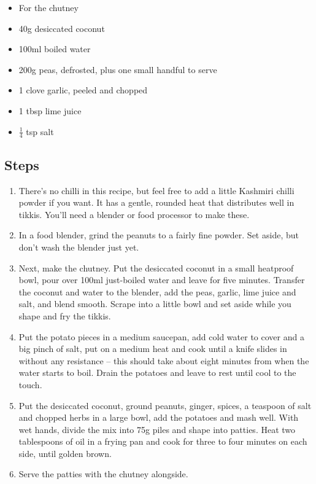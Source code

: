 \documentclass{book}
\begin{document}
\begin{itemize}
\item For the chutney
\item 40g desiccated coconut
\item 100ml boiled water
\item 200g peas, defrosted, plus one small handful to serve
\item 1 clove garlic, peeled and chopped
\item 1 tbsp lime juice 
\item $\frac{1}{4}$ tsp salt
\end{itemize}

\subsection*{Steps}
\begin{enumerate}
\item There’s no chilli in this recipe, but feel free to add a little Kashmiri chilli powder if you want. It has a gentle, rounded heat that distributes well in tikkis. You’ll need a blender or food processor to make these.
\item In a food blender, grind the peanuts to a fairly fine powder. Set aside, but don’t wash the blender just yet.
\item Next, make the chutney. Put the desiccated coconut in a small heatproof bowl, pour over 100ml just-boiled water and leave for five minutes. Transfer the coconut and water to the blender, add the peas, garlic, lime juice and salt, and blend smooth. Scrape into a little bowl and set aside while you shape and fry the tikkis.
\item Put the potato pieces in a medium saucepan, add cold water to cover and a big pinch of salt, put on a medium heat and cook until a knife slides in without any resistance – this should take about eight minutes from when the water starts to boil. Drain the potatoes and leave to rest until cool to the touch.
\item Put the desiccated coconut, ground peanuts, ginger, spices, a teaspoon of salt and chopped herbs in a large bowl, add the potatoes and mash well. With wet hands, divide the mix into 75g piles and shape into patties. Heat two tablespoons of oil in a frying pan and cook for three to four minutes on each side, until golden brown.
\item Serve the patties with the chutney alongside.
\end{enumerate}
\newpage
\end{document}
